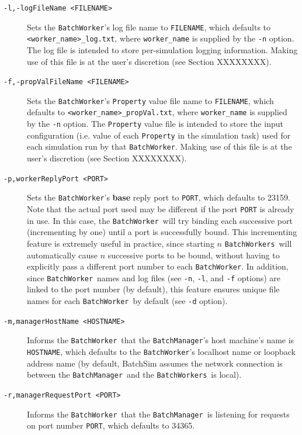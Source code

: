 \documentclass{article}
\newcommand{\BM}{{\tt BatchManager}}
\newcommand{\BW}{{\tt BatchWorker}}
\newcommand{\BWs}{{\tt BatchWorkers}}
\begin{document}
\begin{description}
\item[{\tt -l,-logFileName <FILENAME>} ] \mbox{}

Sets the \BW's log file name to {\tt FILENAME}, which defaults to {\tt <worker\_name>\_log.txt}, where {\tt worker\_name} is supplied by the {\tt -n} option. The log file is intended to store per-simulation logging information. Making use of this file is at the user's discretion (see Section XXXXXXXX).

\item[{\tt -f,-propValFileName <FILENAME>} ] \mbox{}

Sets the \BW's {\tt Property} value file name to {\tt FILENAME}, which defaults to {\tt <worker\_name>\_propVal.txt}, where {\tt worker\_name} is supplied by the {\tt -n} option. The {\tt Property} value file is intended to store the input configuration (i.e. value of each {\tt Property} in the simulation task) used for each simulation run by that \BW. Making use of this file is at the user's discretion (see Section XXXXXXXX).

\item[{\tt -p,workerReplyPort <PORT>} ] \mbox{}

Sets the \BW's \textbf{base} reply port to {\tt PORT}, which defaults to 23159. Note that the actual port used may be different if the port {\tt PORT} is already in use. In this case, the \BW\ will try binding each successive port (incrementing by one) until a port is successfully bound. This incrementing feature is extremely useful in practice, since starting $n$ \BWs\ will automatically cause $n$ successive ports to be bound, without having to explicitly pass a different port number to each \BW. In addition, since \BW\ names and log files (see {\tt -n}, {\tt -l}, and {\tt -f} options) are linked to the port number (by default), this feature ensures unique file names for each \BW\ by default (see {\tt -d} option).

\item[{\tt -m,managerHostName <HOSTNAME>} ] \mbox{}

Informs the \BW\ that the \BM's host machine's name is {\tt HOSTNAME}, which defaults to the \BW's localhost name or loopback address name (by default, BatchSim assumes the network connection is between the \BM\ and the \BWs\ is local).

\item[{\tt -r,managerRequestPort <PORT>} ] \mbox{}

Informs the \BW\ that the \BM\ is listening for requests on port number {\tt PORT}, which defaults to 34365.

\end{description}
\end{document}
